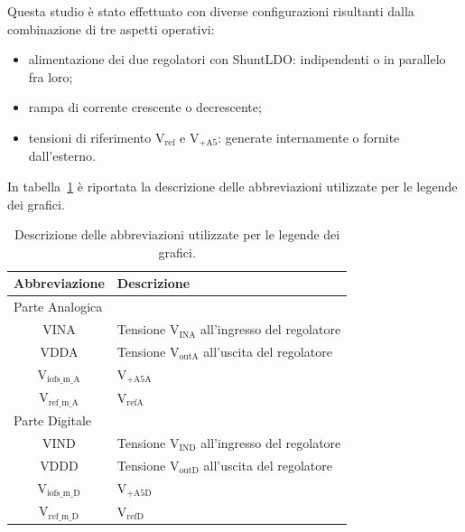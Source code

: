 Questa studio è stato effettuato con diverse configurazioni risultanti dalla combinazione di tre aspetti operativi:
\begin{itemize}
  \item alimentazione dei due regolatori con ShuntLDO: indipendenti o in parallelo fra loro;
  \item rampa di corrente crescente o decrescente;
  \item tensioni di riferimento $\mathrm{V_{ref}}$ e $\mathrm{V_{+A5}}$: generate internamente o fornite dall'esterno.
\end{itemize}

In tabella~\ref{tab:legenda} è riportata la descrizione delle abbreviazioni utilizzate per le legende dei grafici.
\begin{table}
\begin{center}
\begin{tabular}{|c|l|} \hline
 Abbreviazione & Descrizione\\ \hline
\multicolumn{2}{l}{Parte Analogica} \\
\hline
VINA & Tensione $\mathrm{V_{INA}}$ all'ingresso del regolatore  \\ \hline
VDDA & Tensione $\mathrm{V_{outA}}$ all'uscita del regolatore \\ \hline
$\mathrm{V_{iofs \_ m \_ A}}$ & $\mathrm{V_{+A5A}}$ \\ \hline   
$\mathrm{V_{ref \_ m \_ A}}$  & $\mathrm{V_{refA}}$ \\ \hline \hline  
\multicolumn{2}{l}{Parte Digitale} \\ \hline
VIND & Tensione $\mathrm{V_{IND}}$ all'ingresso del regolatore  \\ \hline
VDDD & Tensione $\mathrm{V_{outD}}$ all'uscita del regolatore \\ \hline
$\mathrm{V_{iofs \_ m \_ D}}$ & $\mathrm{V_{+A5D}}$ \\ \hline   
$\mathrm{V_{ref \_ m \_ D}}$  & $\mathrm{V_{refD}}$ \\ \hline
\end{tabular}
\end{center}
\caption{Descrizione delle abbreviazioni utilizzate per le legende dei grafici.}
\label{tab:legenda}
\end{table}

